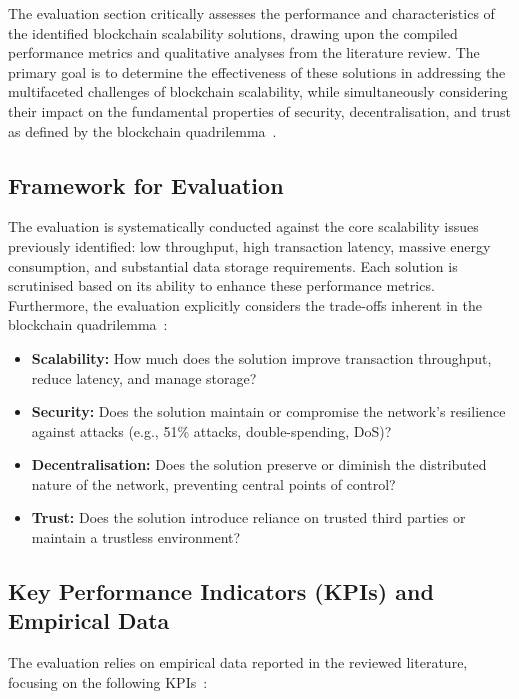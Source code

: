 
The evaluation section critically assesses the performance and characteristics of the identified blockchain scalability solutions, drawing upon the compiled performance metrics and qualitative analyses from the literature review. The primary goal is to determine the effectiveness of these solutions in addressing the multifaceted challenges of blockchain scalability, while simultaneously considering their impact on the fundamental properties of security, decentralisation, and trust as defined by the blockchain quadrilemma~\cite{sanka2021systematic}.

\subsection{Framework for Evaluation}
The evaluation is systematically conducted against the core scalability issues previously identified: low throughput, high transaction latency, massive energy consumption, and substantial data storage requirements. Each solution is scrutinised based on its ability to enhance these performance metrics. Furthermore, the evaluation explicitly considers the trade-offs inherent in the blockchain quadrilemma~\cite{sanka2021systematic}:

\begin{itemize}
    \item \textbf{Scalability:} How much does the solution improve transaction throughput, reduce latency, and manage storage?
    \item \textbf{Security:} Does the solution maintain or compromise the network's resilience against attacks (e.g., 51\% attacks, double-spending, DoS)?
    \item \textbf{Decentralisation:} Does the solution preserve or diminish the distributed nature of the network, preventing central points of control?
    \item \textbf{Trust:} Does the solution introduce reliance on trusted third parties or maintain a trustless environment?
\end{itemize}

\subsection{Key Performance Indicators (KPIs) and Empirical Data}
The evaluation relies on empirical data reported in the reviewed literature, focusing on the following KPIs~\cite{sustainabilityKPIs,wood2014ethereum}:

